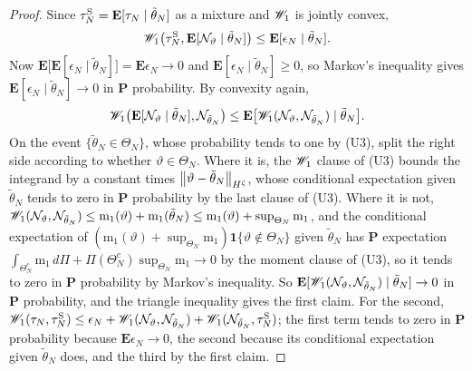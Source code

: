 \begin{proof}
Since $\tau^{\rm S}_N=\mathbf{E}[\tau_N\mid\tilde\theta_N]$ as a mixture and $\mathscr{W}_1$ is jointly convex,
\[
\mathscr{W}_1\big(\tau^{\rm S}_N,\mathbf{E}[\mathcal{N}_\vartheta\mid\tilde\theta_N]\big)\le\mathbf{E}[\epsilon_N\mid\tilde\theta_N] .
\]
Now $\mathbf{E}\big[\mathbf{E}[\epsilon_N\mid\tilde\theta_N]\big]=\mathbf{E}\epsilon_N\to0$ and $\mathbf{E}[\epsilon_N\mid\tilde\theta_N]\ge0$, so Markov's inequality gives $\mathbf{E}[\epsilon_N\mid\tilde\theta_N]\to0$ in $\mathbf{P}$ probability. By convexity again,
\[
\mathscr{W}_1\big(\mathbf{E}[\mathcal{N}_\vartheta\mid\tilde\theta_N],\mathcal{N}_{\tilde\theta_N}\big)\le\mathbf{E}\big[\mathscr{W}_1(\mathcal{N}_\vartheta,\mathcal{N}_{\tilde\theta_N})\mid\tilde\theta_N\big] .
\]
On the event $\{\tilde\theta_N\in\Theta_N\}$, whose probability tends to one by (U3), split the right side according to whether $\vartheta\in\Theta_N$. Where it is, the $\mathscr{W}_1$ clause of (U3) bounds the integrand by a constant times $\left\|\vartheta-\tilde\theta_N\right\|_{H^\zeta}$, whose conditional expectation given $\tilde\theta_N$ tends to zero in $\mathbf{P}$ probability by the last clause of (U3). Where it is not, $\mathscr{W}_1(\mathcal{N}_\vartheta,\mathcal{N}_{\tilde\theta_N})\le\mathrm m_1(\vartheta)+\mathrm m_1(\tilde\theta_N)\le\mathrm m_1(\vartheta)+\sup_{\Theta_N}\mathrm m_1$, and the conditional expectation of $(\mathrm m_1(\vartheta)+\sup_{\Theta_N}\mathrm m_1)\mathbf 1\{\vartheta\notin\Theta_N\}$ given $\tilde\theta_N$ has $\mathbf{P}$ expectation $\int_{\Theta_N^c}\mathrm m_1\,d\Pi+\Pi(\Theta_N^c)\sup_{\Theta_N}\mathrm m_1\to0$ by the moment clause of (U3), so it tends to zero in $\mathbf{P}$ probability by Markov's inequality. So $\mathbf{E}[\mathscr{W}_1(\mathcal{N}_\vartheta,\mathcal{N}_{\tilde\theta_N})\mid\tilde\theta_N]\to0$ in $\mathbf{P}$ probability, and the triangle inequality gives the first claim. For the second, $\mathscr{W}_1(\tau_N,\tau^{\rm S}_N)\le\epsilon_N+\mathscr{W}_1(\mathcal{N}_\vartheta,\mathcal{N}_{\tilde\theta_N})+\mathscr{W}_1(\mathcal{N}_{\tilde\theta_N},\tau^{\rm S}_N)$; the first term tends to zero in $\mathbf{P}$ probability because $\mathbf{E}\epsilon_N\to0$, the second because its conditional expectation given $\tilde\theta_N$ does, and the third by the first claim.


\end{proof}

